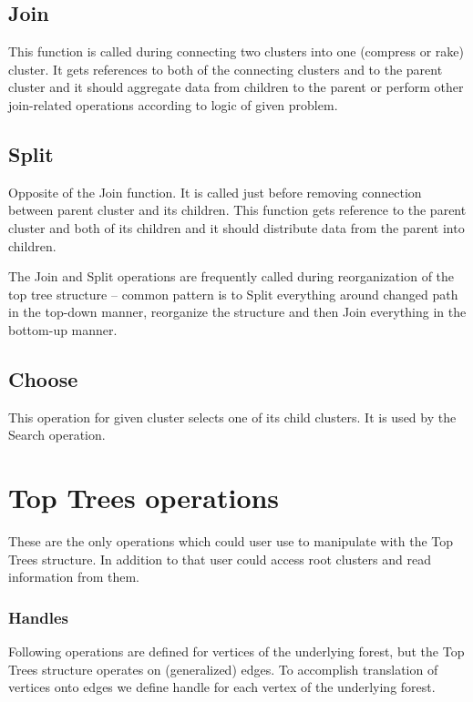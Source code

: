 \subsection{Join}

This function is called during connecting two clusters into one (compress or rake)
cluster. It gets references to both of the connecting clusters and to the parent
cluster and it should aggregate data from children to the parent or perform other
join-related operations according to logic of given problem.

\subsection{Split}

Opposite of the Join function. It is called just before removing connection
between parent cluster and its children. This function gets reference to the
parent cluster and both of its children and it should distribute data from the
parent into children.

The Join and Split operations are frequently called during reorganization of the
top tree structure -- common pattern is to Split everything around changed path
in the top-down manner, reorganize the structure and then Join everything in the
bottom-up manner.

\subsection{Choose}

This operation for given cluster selects one of its child clusters. It is used
by the {\I Search} operation.



\section{Top Trees operations}

These are the only operations which could user use to manipulate with the Top
Trees structure. In addition to that user could access root clusters and read
information from them.

\subsubsection{Handles}

Following operations are defined for vertices of the underlying forest, but the
Top Trees structure operates on (generalized) edges. To accomplish translation
of vertices onto edges we define {\I handle} for each vertex of the underlying
forest.

